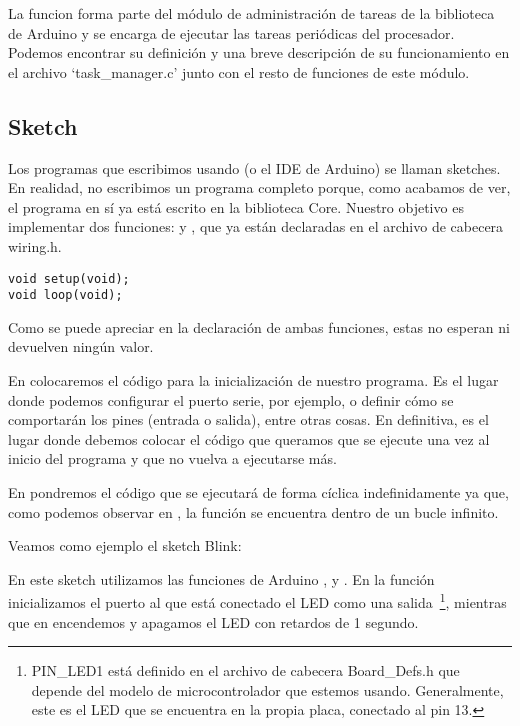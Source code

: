 La funcion  forma parte del módulo de administración de tareas de la biblioteca de Arduino y se encarga de ejecutar las tareas periódicas del procesador. Podemos encontrar su definición y una breve descripción de su funcionamiento en el archivo `task\_manager.c' junto con el resto de funciones de este módulo.

\subsection{Sketch}
Los programas que escribimos usando  (o el IDE de Arduino) se llaman sketches. En realidad, no escribimos un programa completo porque, como acabamos de ver, el programa en sí ya está escrito en la biblioteca Core. Nuestro objetivo es implementar dos funciones:  y , que ya están declaradas en el archivo de cabecera wiring.h.

\begin{lstlisting}[caption=Sección de wiring.h]
void setup(void);
void loop(void);
\end{lstlisting}

Como se puede apreciar en la declaración de ambas funciones, estas no esperan ni devuelven ningún valor.


En  colocaremos el código para la inicialización de nuestro programa. Es el lugar donde podemos configurar el puerto serie, por ejemplo, o definir cómo se comportarán los pines (entrada o salida), entre otras cosas. En definitiva, es el lugar donde debemos colocar el código que queramos que se ejecute una vez al inicio del programa y que no vuelva a ejecutarse más.

En  pondremos el código que se ejecutará de forma cíclica indefinidamente ya que, como podemos observar en , la función  se encuentra dentro de un bucle infinito.

Veamos como ejemplo el sketch Blink:


En este sketch utilizamos las funciones de Arduino , y . En la función  inicializamos el puerto al que está conectado el LED como una salida~\protect\footnote{PIN\_LED1 está definido en el archivo de cabecera Board\_Defs.h que depende del modelo de microcontrolador que estemos usando. Generalmente, este es el LED que se encuentra en la propia placa, conectado al pin 13.}, mientras que en  encendemos y apagamos el LED con retardos de 1 segundo.

